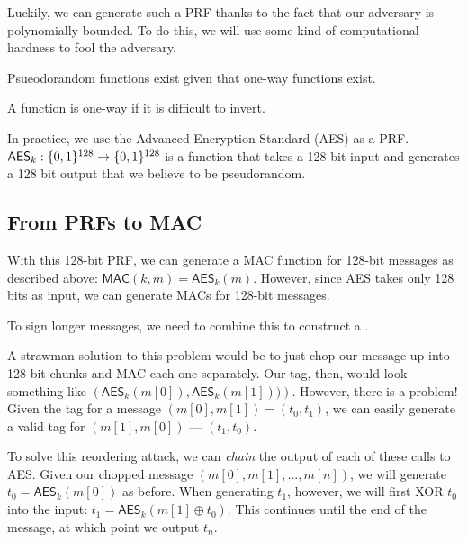 Luckily, we can generate such a PRF thanks to the fact that our adversary is polynomially bounded. To do this, we will use some kind of computational hardness to fool the adversary.

\begin{theorem}
	Psueodorandom functions exist given that one-way functions exist.
\end{theorem}

\begin{definition}
	A function is one-way if it is difficult to invert. %
\end{definition}

In practice, we use the Advanced Encryption Standard (AES) as a PRF. $\mathsf{AES}_k: \{0,1\}^{128} \rightarrow \{0,1\}^{128}$ is a function that takes a 128 bit input and generates a 128 bit output that we believe to be pseudorandom.  

\subsection{From PRFs to MAC}
With this 128-bit PRF, we can generate a MAC function for 128-bit messages as described above: $\mathsf{MAC}(k, m) = \mathsf{AES}_k(m)$. However, since AES takes only 128 bits as input, we can generate MACs for 128-bit messages. 

To sign longer messages, we need to combine this  to construct a . 

A strawman solution to this problem would be to just chop our message up into 128-bit chunks and MAC each one separately. Our tag, then, would look something like $\left(\mathsf{AES}_k(m[0]), \mathsf{AES}_k(m[1]))\right)$. However, there is a problem! Given the tag for a message $(m[0], m[1]) = (t_0, t_1)$, we can easily generate a valid tag for $(m[1], m[0])$ --- $(t_1, t_0)$. 

To solve this reordering attack, we can \emph{chain} the output of each of these calls to AES. Given our chopped message $(m[0], m[1], \ldots, m[n])$, we will generate $t_0 = \mathsf{AES}_k(m[0])$ as before. When generating $t_1$, however, we will first XOR $t_0$ into the input: $t_1 = \mathsf{AES}_k(m[1] \oplus t_0)$. This continues until the end of the message, at which point we output $t_n$.

